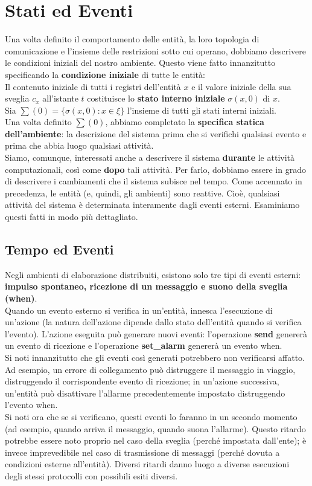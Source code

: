 \section{Stati ed Eventi}
Una volta definito il comportamento delle entità, la loro topologia di
comunicazione e l'insieme delle restrizioni sotto cui operano, dobbiamo
descrivere le condizioni iniziali del nostro ambiente. Questo viene fatto
innanzitutto specificando la \textbf{condizione iniziale} di tutte le entità:\\
Il contenuto iniziale di tutti i registri dell'entità $x$ e il valore iniziale
della sua sveglia $c_x$ all'istante $t$ costituisce lo \textbf{stato interno
    iniziale} $\sigma (x, 0)$ di $x$.\\
Sia $\sum(0) = \{\sigma (x, 0) : x \in \xi\}$ l'insieme di tutti gli stati interni
iniziali.\\
Una volta definito $\sum(0)$, abbiamo completato la \textbf{specifica statica
    dell'ambiente}: la descrizione del sistema prima che si verifichi qualsiasi
evento e prima che abbia luogo qualsiasi attività.\\
Siamo, comunque, interessati anche a descrivere il sistema \textbf{durante} le
attività computazionali, così come \textbf{dopo} tali attività. Per farlo,
dobbiamo essere in grado di descrivere i cambiamenti che il sistema subisce nel
tempo. Come accennato in precedenza, le entità (e, quindi, gli ambienti) sono
reattive. Cioè, qualsiasi attività del sistema è determinata interamente dagli
eventi esterni. Esaminiamo questi fatti in modo più dettagliato.

\subsection{Tempo ed Eventi}
Negli ambienti di elaborazione distribuiti, esistono solo tre tipi di eventi
esterni: \textbf{impulso spontaneo, ricezione di un messaggio e suono della
    sveglia (when)}.\\
Quando un evento esterno si verifica in un'entità, innesca l'esecuzione di
un'azione (la natura dell'azione dipende dallo stato dell'entità quando si
verifica l'evento). L'azione eseguita può generare nuovi eventi: l'operazione
\textbf{send} genererà un evento di ricezione e l'operazione \textbf{set\_alarm}
genererà un evento when.\\
Si noti innanzitutto che gli eventi così generati potrebbero non verificarsi
affatto. Ad esempio, un errore di collegamento può distruggere il messaggio in
viaggio, distruggendo il corrispondente evento di ricezione; in un'azione
successiva, un'entità può disattivare l'allarme precedentemente impostato
distruggendo l'evento when.\\
Si noti ora che se si verificano, questi eventi lo faranno in un secondo momento
(ad esempio, quando arriva il messaggio, quando suona l'allarme). Questo ritardo
potrebbe essere noto proprio nel caso della sveglia (perché impostata
dall'ente); è invece imprevedibile nel caso di trasmissione di messaggi (perché
dovuta a condizioni esterne all'entità). Diversi ritardi danno luogo a diverse
esecuzioni degli stessi protocolli con possibili esiti diversi.


